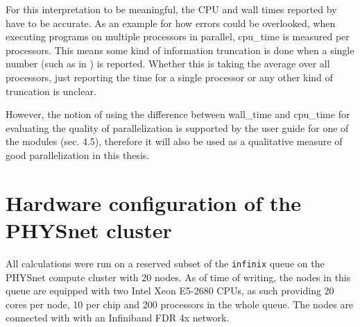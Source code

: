 \documentclass[main.tex]{subfiles}
\begin{document}
For this interpretation to be meaningful, the CPU and wall times reported by \QE have to be accurate.
As an example for how errors could be overlooked, when executing programs on multiple processors in parallel, \gls{cpu_time} is measured per processors.
This means some kind of information truncation is done when a single number (such as in \QE) is reported.
Whether this is taking the average over all processors, just reporting the time for a single processor or any other kind of truncation is unclear.

However, the notion of using the difference between \gls{wall_time} and \gls{cpu_time} for evaluating the quality of parallelization is supported by the user guide for one of the \QE modules \cite{noauthor_pwscf_nodate} (sec. 4.5), therefore it will also be used as a qualitative measure of good parallelization in this thesis.

\section{Hardware configuration of the PHYSnet cluster}\label{sec:hardware_physnet}

All calculations were run on a reserved subset of the \texttt{infinix} queue on the PHYSnet compute cluster with 20 nodes.
As of time of writing, the nodes in this queue are equipped with two Intel Xeon E5-2680 CPUs, as such providing 20 cores per node, 10 per chip and 200 processors in the whole queue.
The nodes are connected with with an Infiniband FDR 4x network.
\end{document}
